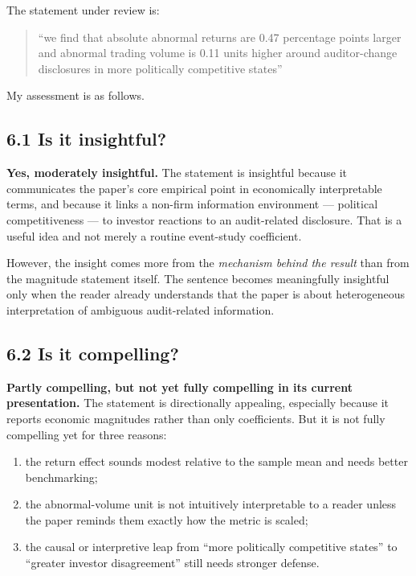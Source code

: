 The statement under review is:

\begin{quote}
``we find that absolute abnormal returns are 0.47 percentage points larger and abnormal trading volume is 0.11 units higher around auditor-change disclosures in more politically competitive states''
\end{quote}

My assessment is as follows.

\subsection*{6.1 Is it insightful?}

\textbf{Yes, moderately insightful.} The statement is insightful because it communicates the paper's core empirical point in economically interpretable terms, and because it links a non-firm information environment --- political competitiveness --- to investor reactions to an audit-related disclosure. That is a useful idea and not merely a routine event-study coefficient.

However, the insight comes more from the \emph{mechanism behind the result} than from the magnitude statement itself. The sentence becomes meaningfully insightful only when the reader already understands that the paper is about heterogeneous interpretation of ambiguous audit-related information.

\subsection*{6.2 Is it compelling?}

\textbf{Partly compelling, but not yet fully compelling in its current presentation.} The statement is directionally appealing, especially because it reports economic magnitudes rather than only coefficients. But it is not fully compelling yet for three reasons:

\begin{enumerate}[leftmargin=1.5em]
    \item the return effect sounds modest relative to the sample mean and needs better benchmarking;
    \item the abnormal-volume unit is not intuitively interpretable to a reader unless the paper reminds them exactly how the metric is scaled;
    \item the causal or interpretive leap from ``more politically competitive states'' to ``greater investor disagreement'' still needs stronger defense.
\end{enumerate}

